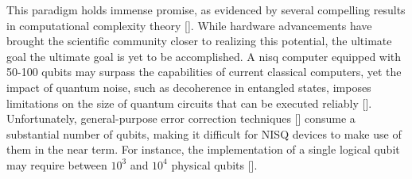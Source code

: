 

This paradigm holds immense promise, as evidenced by several compelling results in computational complexity theory [\cite{shor1994algorithms,grover1996fast}]. While hardware advancements have brought the scientific community closer to realizing this potential, the ultimate goal the ultimate goal is yet to be accomplished. A \acrfull{nisq} computer equipped with 50-100 qubits may surpass the capabilities of current classical computers, yet the impact of quantum noise, such as decoherence in entangled states, imposes limitations on the size of quantum circuits that can be executed reliably [\cite{preskill2018quantum}]. Unfortunately, general-purpose error correction techniques [\cite{calderbank1996good, gottesman1997stabilizer, steane1996error}] consume a substantial number of qubits, making it difficult for NISQ devices to make use of them in the near term. For instance, the implementation of a single logical qubit may require between $10^3$ and $10^4$ physical qubits [\cite{fowler2012surface}]. 

